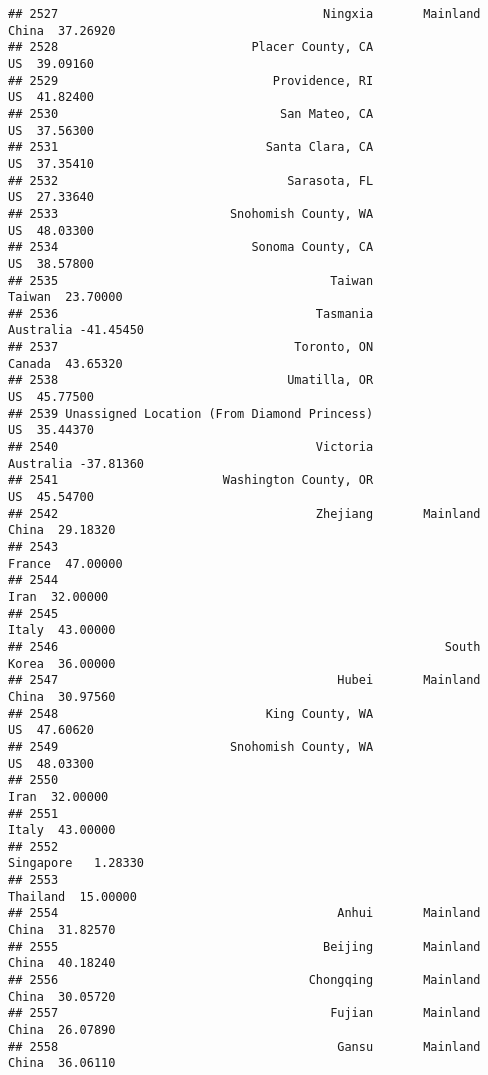 \documentclass[
]{article}
\begin{document}
\begin{verbatim}
## 2527                                     Ningxia       Mainland China  37.26920
## 2528                           Placer County, CA                   US  39.09160
## 2529                              Providence, RI                   US  41.82400
## 2530                               San Mateo, CA                   US  37.56300
## 2531                             Santa Clara, CA                   US  37.35410
## 2532                                Sarasota, FL                   US  27.33640
## 2533                        Snohomish County, WA                   US  48.03300
## 2534                           Sonoma County, CA                   US  38.57800
## 2535                                      Taiwan               Taiwan  23.70000
## 2536                                    Tasmania            Australia -41.45450
## 2537                                 Toronto, ON               Canada  43.65320
## 2538                                Umatilla, OR                   US  45.77500
## 2539 Unassigned Location (From Diamond Princess)                   US  35.44370
## 2540                                    Victoria            Australia -37.81360
## 2541                       Washington County, OR                   US  45.54700
## 2542                                    Zhejiang       Mainland China  29.18320
## 2543                                                           France  47.00000
## 2544                                                             Iran  32.00000
## 2545                                                            Italy  43.00000
## 2546                                                      South Korea  36.00000
## 2547                                       Hubei       Mainland China  30.97560
## 2548                             King County, WA                   US  47.60620
## 2549                        Snohomish County, WA                   US  48.03300
## 2550                                                             Iran  32.00000
## 2551                                                            Italy  43.00000
## 2552                                                        Singapore   1.28330
## 2553                                                         Thailand  15.00000
## 2554                                       Anhui       Mainland China  31.82570
## 2555                                     Beijing       Mainland China  40.18240
## 2556                                   Chongqing       Mainland China  30.05720
## 2557                                      Fujian       Mainland China  26.07890
## 2558                                       Gansu       Mainland China  36.06110

\end{verbatim}
\end{document}
